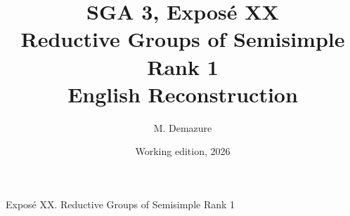 \documentclass[11pt,a4paper,oneside,leqno]{book}
\title{SGA 3, Exposé XX\\Reductive Groups of Semisimple Rank 1\\
English Reconstruction}
\author{M. Demazure}
\date{Working edition, 2026}
\begin{document}
\frontmatter
\maketitle
\tableofcontents
\mainmatter

  {Exposé XX. Reductive Groups of Semisimple Rank 1}

















\end{document}
